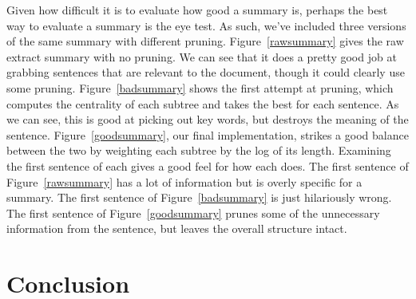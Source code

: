 \documentclass[12pt]{article}
\theoremstyle{plain}
\theoremstyle{definition}
\theoremstyle{remark}
\theoremstyle{plain}
\begin{document}
Given how difficult it is to evaluate how good a summary is, perhaps the best way to evaluate a summary is the eye test. As such, we've included three versions of the same summary with different pruning. Figure~\ref{rawsummary} gives the raw extract summary with no pruning. We can see that it does a pretty good job at grabbing sentences that are relevant to the document, though it could clearly use some pruning. Figure~\ref{badsummary} shows the first attempt at pruning, which computes the centrality of each subtree and takes the best for each sentence. As we can see, this is good at picking out key words, but destroys the meaning of the sentence. Figure~\ref{goodsummary}, our final implementation, strikes a good balance between the two by weighting each subtree by the log of its length. Examining the first sentence of each gives a good feel for how each does. The first sentence of Figure~\ref{rawsummary} has a lot of information but is overly specific for a summary. The first sentence of Figure~\ref{badsummary} is just hilariously wrong. The first sentence of Figure~\ref{goodsummary} prunes some of the unnecessary information from the sentence, but leaves the overall structure intact.



\section{Conclusion}
	
\end{document}
